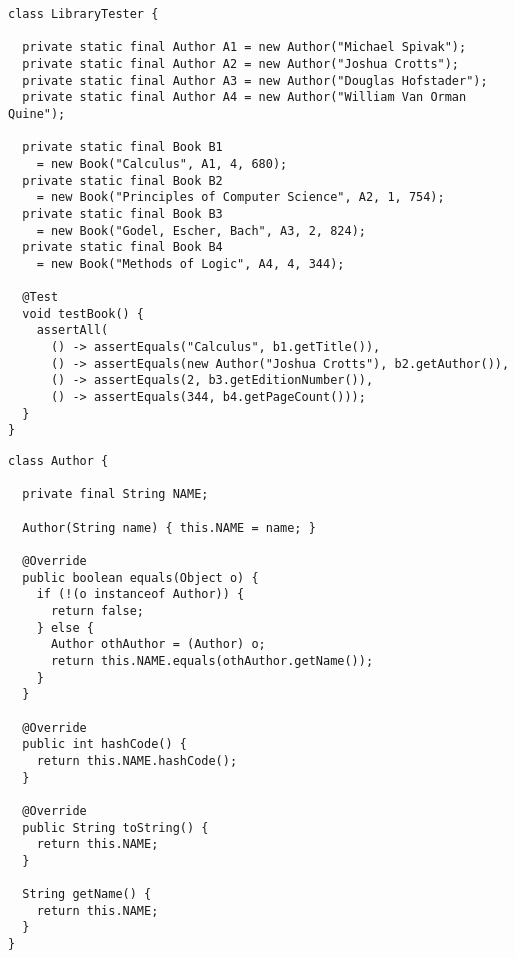\begin{lstlisting}[language=MyJava]
class LibraryTester {

  private static final Author A1 = new Author("Michael Spivak");
  private static final Author A2 = new Author("Joshua Crotts");
  private static final Author A3 = new Author("Douglas Hofstader");
  private static final Author A4 = new Author("William Van Orman Quine");
  
  private static final Book B1 
    = new Book("Calculus", A1, 4, 680);
  private static final Book B2 
    = new Book("Principles of Computer Science", A2, 1, 754);
  private static final Book B3 
    = new Book("Godel, Escher, Bach", A3, 2, 824);
  private static final Book B4 
    = new Book("Methods of Logic", A4, 4, 344);

  @Test
  void testBook() {
    assertAll(
      () -> assertEquals("Calculus", b1.getTitle()),
      () -> assertEquals(new Author("Joshua Crotts"), b2.getAuthor()),
      () -> assertEquals(2, b3.getEditionNumber()),
      () -> assertEquals(344, b4.getPageCount()));
  }
}
\end{lstlisting}

\begin{lstlisting}[language=MyJava]
class Author {

  private final String NAME;

  Author(String name) { this.NAME = name; }

  @Override 
  public boolean equals(Object o) {
    if (!(o instanceof Author)) {
      return false;
    } else {
      Author othAuthor = (Author) o;
      return this.NAME.equals(othAuthor.getName());
    }
  }

  @Override
  public int hashCode() {
    return this.NAME.hashCode();
  }

  @Override
  public String toString() {
    return this.NAME;
  }

  String getName() {
    return this.NAME;
  }
}
\end{lstlisting}

